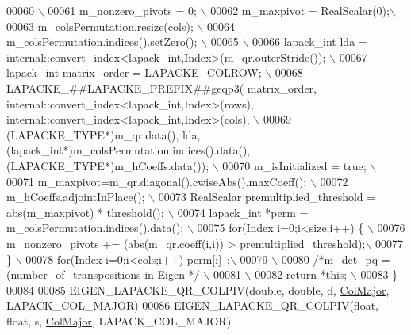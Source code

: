 \begin{DoxyCode}
00060 \textcolor{preprocessor}{\(\backslash\)}
00061 \textcolor{preprocessor}{  m\_nonzero\_pivots = 0; \(\backslash\)}
00062 \textcolor{preprocessor}{  m\_maxpivot = RealScalar(0);\(\backslash\)}
00063 \textcolor{preprocessor}{  m\_colsPermutation.resize(cols); \(\backslash\)}
00064 \textcolor{preprocessor}{  m\_colsPermutation.indices().setZero(); \(\backslash\)}
00065 \textcolor{preprocessor}{\(\backslash\)}
00066 \textcolor{preprocessor}{  lapack\_int lda = internal::convert\_index<lapack\_int,Index>(m\_qr.outerStride()); \(\backslash\)}
00067 \textcolor{preprocessor}{  lapack\_int matrix\_order = LAPACKE\_COLROW; \(\backslash\)}
00068 \textcolor{preprocessor}{  LAPACKE\_##LAPACKE\_PREFIX##geqp3( matrix\_order, internal::convert\_index<lapack\_int,Index>(rows),
       internal::convert\_index<lapack\_int,Index>(cols), \(\backslash\)}
00069 \textcolor{preprocessor}{                              (LAPACKE\_TYPE*)m\_qr.data(), lda,
       (lapack\_int*)m\_colsPermutation.indices().data(), (LAPACKE\_TYPE*)m\_hCoeffs.data()); \(\backslash\)}
00070 \textcolor{preprocessor}{  m\_isInitialized = true; \(\backslash\)}
00071 \textcolor{preprocessor}{  m\_maxpivot=m\_qr.diagonal().cwiseAbs().maxCoeff(); \(\backslash\)}
00072 \textcolor{preprocessor}{  m\_hCoeffs.adjointInPlace(); \(\backslash\)}
00073 \textcolor{preprocessor}{  RealScalar premultiplied\_threshold = abs(m\_maxpivot) * threshold(); \(\backslash\)}
00074 \textcolor{preprocessor}{  lapack\_int *perm = m\_colsPermutation.indices().data(); \(\backslash\)}
00075 \textcolor{preprocessor}{  for(Index i=0;i<size;i++) \{ \(\backslash\)}
00076 \textcolor{preprocessor}{    m\_nonzero\_pivots += (abs(m\_qr.coeff(i,i)) > premultiplied\_threshold);\(\backslash\)}
00077 \textcolor{preprocessor}{  \} \(\backslash\)}
00078 \textcolor{preprocessor}{  for(Index i=0;i<cols;i++) perm[i]--;\(\backslash\)}
00079 \textcolor{preprocessor}{\(\backslash\)}
00080 \textcolor{preprocessor}{  }\textcolor{comment}{/*m\_det\_pq = (number\_of\_transpositions%
       in Eigen */}\textcolor{preprocessor}{ \(\backslash\)}
00081 \textcolor{preprocessor}{\(\backslash\)}
00082 \textcolor{preprocessor}{  return *this; \(\backslash\)}
00083 \textcolor{preprocessor}{\}}
00084 
00085 EIGEN\_LAPACKE\_QR\_COLPIV(\textcolor{keywordtype}{double},   \textcolor{keywordtype}{double},        d, \hyperlink{group__enums_ggaacded1a18ae58b0f554751f6cdf9eb13a0cbd4bdd0abcfc0224c5fcb5e4f6669a}{ColMajor}, LAPACK\_COL\_MAJOR)
00086 EIGEN\_LAPACKE\_QR\_COLPIV(\textcolor{keywordtype}{float},    \textcolor{keywordtype}{float},         s, \hyperlink{group__enums_ggaacded1a18ae58b0f554751f6cdf9eb13a0cbd4bdd0abcfc0224c5fcb5e4f6669a}{ColMajor}, LAPACK\_COL\_MAJOR)

\end{DoxyCode}
